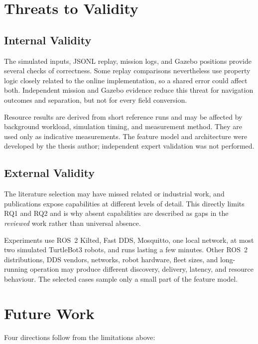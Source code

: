 \section{Threats to Validity}

\subsection{Internal Validity}

The simulated inputs, JSONL replay, mission logs, and Gazebo positions
provide several checks of correctness. Some replay comparisons nevertheless
use property logic closely related to the online implementation, so a shared
error could affect both. Independent mission and Gazebo evidence reduce this
threat for navigation outcomes and separation, but not for every field
conversion.

Resource results are derived from short reference runs and may be affected by
background workload, simulation timing, and measurement method. They are used
only as indicative measurements. The feature model and architecture were
developed by the thesis author; independent expert validation was not
performed.

\subsection{External Validity}

The literature selection may have missed related or industrial work, and
publications expose capabilities at different levels of detail. This directly
limits RQ1 and RQ2 and is why absent capabilities are described as gaps in the
\emph{reviewed} work rather than universal absence.

Experiments use ROS~2 Kilted, Fast DDS, Mosquitto, one local network, at most
two simulated TurtleBot3 robots, and runs lasting a few minutes. Other ROS~2
distributions, DDS vendors, networks, robot hardware, fleet sizes, and
long-running operation may produce different discovery, delivery, latency, and
resource behaviour. The selected cases sample only a small part of the feature
model.

\section{Future Work}

Four directions follow from the limitations above:

